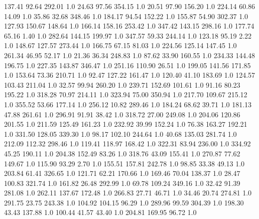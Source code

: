     137.41     92.64    292.01  1.0
     24.63     97.56    354.15  1.0
     20.51     97.90    156.20  1.0
    224.14     60.86     14.09  1.0
     35.86     32.68    348.46  1.0
    184.17     94.54    152.22  1.0
    155.87     54.90    302.37  1.0
    127.93    150.67    148.64  1.0
    166.14    158.16    253.42  1.0
    347.42    143.15    298.16  1.0
    177.74     65.16      1.40  1.0
    282.64    144.15    199.97  1.0
    347.57     59.33    244.14  1.0
    123.18     95.19      2.22  1.0
    148.67    127.57    273.44  1.0
    166.75     67.15     81.03  1.0
    224.56    125.14    147.45  1.0
    261.34     46.95     52.17  1.0
     21.36     36.34    248.83  1.0
     87.62     33.90    160.55  1.0
    234.33    144.48    196.75  1.0
    227.35    143.87    346.47  1.0
    251.16    110.90     26.51  1.0
    199.05    141.56    171.85  1.0
    153.64     73.36    210.71  1.0
     92.47    127.22    161.47  1.0
    120.40     41.10    183.69  1.0
    124.57    103.43    211.04  1.0
     32.57     99.94    260.20  1.0
    239.71    152.69    101.61  1.0
     91.16     80.23    195.22  1.0
    318.28     70.97    214.11  1.0
    323.94     75.00    350.94  1.0
    217.70    109.67    215.12  1.0
    355.52     53.66    177.14  1.0
    256.12     10.82    289.46  1.0
    184.24     68.62     39.71  1.0
    181.13     47.88    261.61  1.0
    296.91     91.91     38.42  1.0
    318.72     27.00    249.08  1.0
    204.06    120.86    201.55  1.0
    211.59    125.49    161.23  1.0
    232.92     39.99    152.24  1.0
     76.38    163.27    192.21  1.0
    331.50    128.05    339.30  1.0
     98.17    102.10    244.64  1.0
     40.68    135.03    281.74  1.0
    212.09    112.32    298.46  1.0
    119.41    118.97    168.42  1.0
    322.31     83.94    236.00  1.0
    334.92     45.25    190.11  1.0
    204.38    152.49     83.26  1.0
    318.76     43.09    155.41  1.0
    270.87     77.62    149.67  1.0
    115.90     93.29      2.70  1.0
    155.51    157.81    242.78  1.0
     98.85     33.38     49.13  1.0
    203.84     61.41    326.65  1.0
    121.71     62.21    170.66  1.0
    169.46     70.04    138.37  1.0
     28.47    100.83    321.74  1.0
    161.82     26.48    292.99  1.0
     69.78    109.24    349.16  1.0
     32.42     91.39    281.08  1.0
    262.11    137.67    172.48  1.0
    266.83     27.71     46.71  1.0
     34.46     20.74    274.81  1.0
    291.75     23.75    243.38  1.0
    104.92    104.15     96.29  1.0
    289.96     99.59    304.39  1.0
    198.30     43.43    137.88  1.0
    100.44     41.57     43.40  1.0
    204.81    169.95     96.72  1.0
